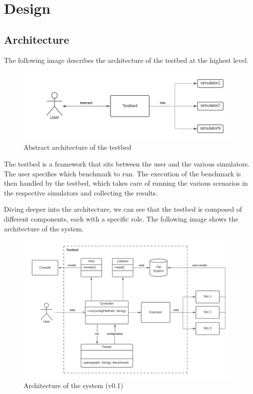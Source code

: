 \documentclass[12pt,a4paper,openright,twoside]{book}
\begin{document}
\chapter{Design}

\section{Architecture}

The following image describes the architecture of the testbed at the highest level.

\begin{figure}[H]
  \centering
  \includegraphics[width=\textwidth]{figures/architecture-high-level.png}
  \caption{Abstract architecture of the testbed}
\end{figure}

The testbed is a framework that sits between the user and the various simulators.
The user specifies which benchmark to run.
The execution of the benchmark is then handled by the testbed, which takes care of running the various scenarios in the respective simulators and collecting the results.

Diving deeper into the architecture, we can see that the testbed is composed of different components, each with a specific role.
The following image shows the architecture of the system.

\begin{figure}[h]
  \centering
  \includegraphics[width=\textwidth]{figures/testbed-architecture.png}
  \caption{Architecture of the system (v0.1)}
  \label{fig:random-image}
\end{figure}
\end{document}
